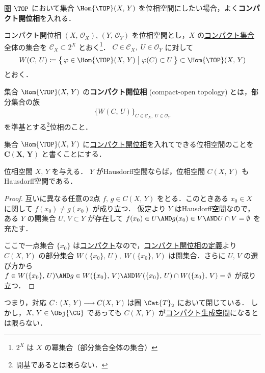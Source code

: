 \documentclass[algtopo_main]{subfiles}
\begin{document}
圏 $\TOP$ において集合 $\Hom{\TOP}(X,\, Y)$ を位相空間にしたい場合，よく\textbf{コンパクト開位相}を入れる．

\begin{mydef}[label=def:compact-open]{コンパクト開位相}
    $(X,\, \mathscr{O}_X),\, (Y,\, \mathscr{O}_Y)$ を位相空間とし，$X$ の\hyperref[def:compact]{コンパクト集合}全体の集合を $\mathscr{C}_X \subset 2^X$ とおく\footnote{$2^X$ は $X$ の冪集合（部分集合全体の集合）}．
    $C \in \mathscr{C}_X,\; U \in \mathscr{O}_Y$ に対して
    \begin{align}
        W(C,\, U) \coloneqq \bigl\{\, \varphi \in \Hom{\TOP}(X,\, Y) \bigm| \varphi(C) \subset U \,\bigr\} \subset \Hom{\TOP}(X,\, Y)
    \end{align}
    とおく．
    
    集合 $\Hom{\TOP}(X,\, Y)$ の\textbf{コンパクト開位相} (compact-open topology) とは，部分集合の族
    \begin{align}
        \bigl\{W(C,\, U)\bigr\}_{C \in \mathscr{C}_X,\; U \in \mathscr{O}_Y}
    \end{align}
    を準基とする\footnote{開基であるとは限らない．}位相のこと．
\end{mydef}

集合 $\Hom{\TOP}(X,\, Y)$ に\hyperref[def:compact-open]{コンパクト開位相}を入れてできる位相空間のことを $\bm{C(X,\, Y)}$ と書くことにする．

\begin{mylem}[]{}
    位相空間 $X,\, Y$ を与える．
    $Y$ がHausdorff空間ならば，位相空間 $C(X,\, Y)$ もHausdorff空間である．
\end{mylem}

\begin{proof}
    互いに異なる任意の2点 $f,\, g \in C(X,\, Y)$ をとる．このときある $x_0 \in X$ に関して $f(x_0) \neq g(x_0)$ が成り立つ．
    仮定より $Y$ はHausdorff空間なので，ある $Y$ の開集合 $U,\, V \subset Y$ が存在して $f(x_0) \in U \AND g(x_0) \in V \AND U \cap V = \emptyset$ を充たす．
    
    ここで一点集合 $\{x_0\}$ は\hyperref[def:compact]{コンパクト}なので，\hyperref[def:compact-open]{コンパクト開位相の定義}より
    $C(X,\, Y)$ の部分集合
    $W(\{x_0\},\, U),\; W(\{x_0\},\, V)$
    は開集合．さらに $U,\, V$ の選び方から $f \in W(\{x_0\},\, U) \AND g \in W(\{x_0\},\, V) \AND W(\{x_0\},\, U) \cap W(\{x_0\},\, V) = \emptyset$ が成り立つ．
\end{proof}

つまり，対応 $C \colon (X,\, Y) \longrightarrow C(X,\, Y)$ は圏 $\Cat{T}_2$ において閉じている．
しかし，$X,\, Y \in \Obj{\CG}$ であっても $C(X,\, Y)$ が\hyperref[def:CG]{コンパクト生成空間}になるとは限らない．
\end{document}
